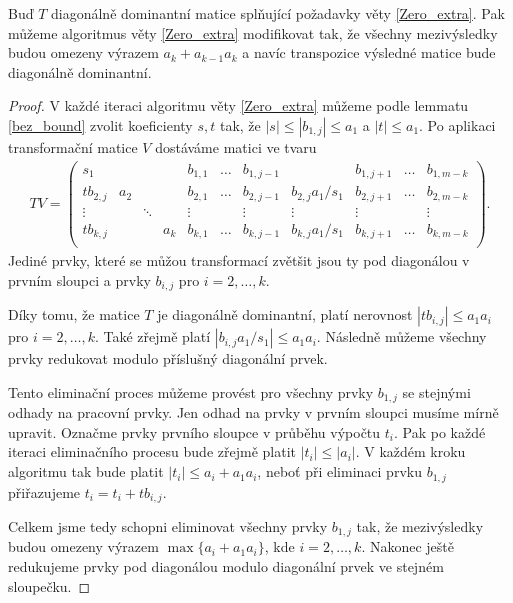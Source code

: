 \begin{lem} \label{Zero_extra_modified}
Buď $ T $ diagonálně dominantní matice splňující požadavky věty \ref{Zero_extra}.
Pak můžeme algoritmus věty \ref{Zero_extra} modifikovat tak, že všechny
mezivýsledky budou omezeny výrazem $ a_k + a_{k - 1} a_k $ 
a navíc transpozice výsledné matice bude diagonálně dominantní.
\end{lem}
\begin{proof}
V každé iteraci algoritmu věty \ref{Zero_extra} můžeme podle lemmatu
\ref{bez_bound} zvolit koeficienty $ s, t $ tak, že $ |s| \leq |b_{1,j}| \leq a_1$
a $ |t| \leq a_1 $. Po aplikaci transformační matice $ V $ dostáváme matici ve
tvaru
\begin{align*}
TV =
    \left(
    \begin{array}{cccc|ccccccc}
        s_1      &     &        &     & b_{1,1} & \hdots & b_{1,j-1} &                   & b_{1,j+1} & \hdots & b_{1,m-k} \\
        tb_{2,j} & a_2 &        &     & b_{2,1} & \hdots & b_{2,j-1} & b_{2,j} a_1 / s_1 & b_{2,j+1} & \hdots & b_{2,m-k} \\
        \vdots   &     & \ddots &     & \vdots  &        & \vdots    & \vdots            & \vdots    &        & \vdots    \\
        tb_{k,j} &     &        & a_k & b_{k,1} & \hdots & b_{k,j-1} & b_{k,j} a_1 / s_1 & b_{k,j+1} & \hdots & b_{k,m-k} \\
    \end{array}
    \right).
\end{align*}
Jediné prvky, které se můžou transformací zvětšit jsou ty pod diagonálou v 
prvním sloupci a prvky $ b_{i,j} $ pro $ i = 2,\dots,k $.

Díky tomu, že matice $ T $ je diagonálně dominantní, platí nerovnost
$ |tb_{i,j}| \leq a_1 a_i $ pro $ i = 2,\dots,k $. Také zřejmě platí
$ | b_{i,j} a_1 / s_1 | \leq a_1 a_i $. Následně můžeme všechny prvky redukovat
modulo příslušný diagonální prvek.

Tento eliminační proces můžeme provést pro všechny prvky $ b_{1, j} $ se stejnými
odhady na pracovní prvky. Jen odhad na prvky v prvním sloupci musíme mírně upravit.
Označme prvky prvního sloupce v průběhu výpočtu $ t_i $. Pak po každé iteraci
eliminačního procesu bude zřejmě platit $ |t_i| \leq |a_i| $. V každém kroku
algoritmu tak bude platit $ |t_i| \leq a_i + a_1 a_i $, neboť při eliminaci
prvku $ b_{1,j} $ přiřazujeme $ t_i = t_i + tb_{i,j} $.

Celkem jsme tedy schopni eliminovat všechny prvky $ b_{1,j} $ tak, že  
mezivýsledky budou omezeny výrazem $ \max\{ a_i + a_1 a_i \} $, kde 
$ i = 2,\dots,k $. Nakonec ještě redukujeme prvky pod diagonálou modulo 
diagonální prvek ve stejném sloupečku.


\end{proof}
